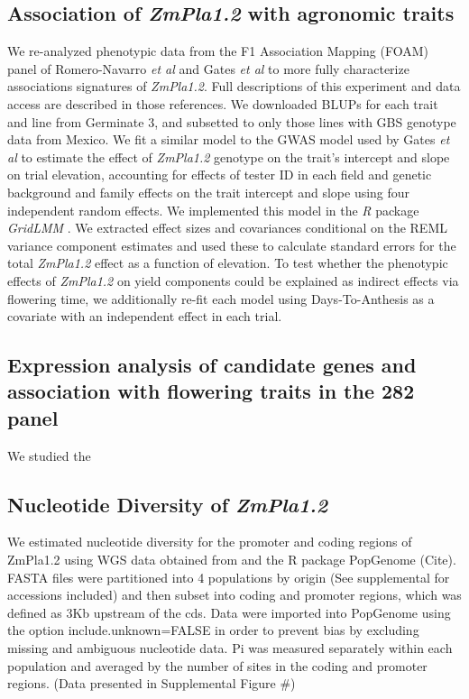 \documentclass[9pt,twocolumn,twoside,lineno]{gsajnl}
\begin{document}
\subsection{Association of \textit{ZmPla1.2} with agronomic traits}
We re-analyzed phenotypic data from the F1 Association Mapping (FOAM) panel of Romero-Navarro \textit{et al} \cite{Romero_Navarro2017-cn} and Gates \textit{et al} \cite{Gates2019-xu} to more fully characterize associations signatures of \textit{ZmPla1.2}. 
Full descriptions of this experiment and data access are described in those references. 
We downloaded BLUPs for each trait and line from Germinate 3, and subsetted to only those lines with GBS genotype data from Mexico. 
We fit a similar model to the GWAS model used by Gates \textit{et al} \cite{Gates2019-xu} to estimate the effect of \textit{ZmPla1.2} genotype on the trait's intercept and slope on trial elevation, accounting for effects of tester ID in each field and genetic background and family effects on the trait intercept and slope using four independent random effects. 
We implemented this model in the \textit{R} package \textit{GridLMM} \cite{GridLMM2019}. 
We extracted effect sizes and covariances conditional on the REML variance component estimates and used these to calculate standard errors for the total \textit{ZmPla1.2} effect as a function of elevation. 
To test whether the phenotypic effects of \textit{ZmPla1.2} on yield components could be explained as indirect effects via flowering time, we additionally re-fit each model using Days-To-Anthesis as a covariate with an independent effect in each trial.
\subsection{Expression analysis of candidate genes and association with flowering traits in the 282 panel}
We studied the 

\subsection{Nucleotide Diversity of \textit{ZmPla1.2} }
We estimated nucleotide diversity for the promoter and coding regions of ZmPla1.2 using WGS data obtained from \cite{Wang2017-bc} and the R package PopGenome (Cite). 
FASTA files were partitioned into 4 populations by origin (See supplemental for accessions included) and then subset into coding and promoter regions, which was defined as 3Kb upstream of the cds. 
Data were imported into PopGenome using the option include.unknown=FALSE in order to prevent bias by excluding missing and ambiguous nucleotide data.
Pi was measured separately within each population and averaged by the number of sites in the coding and promoter regions. (Data presented in Supplemental Figure #)
\end{document}
